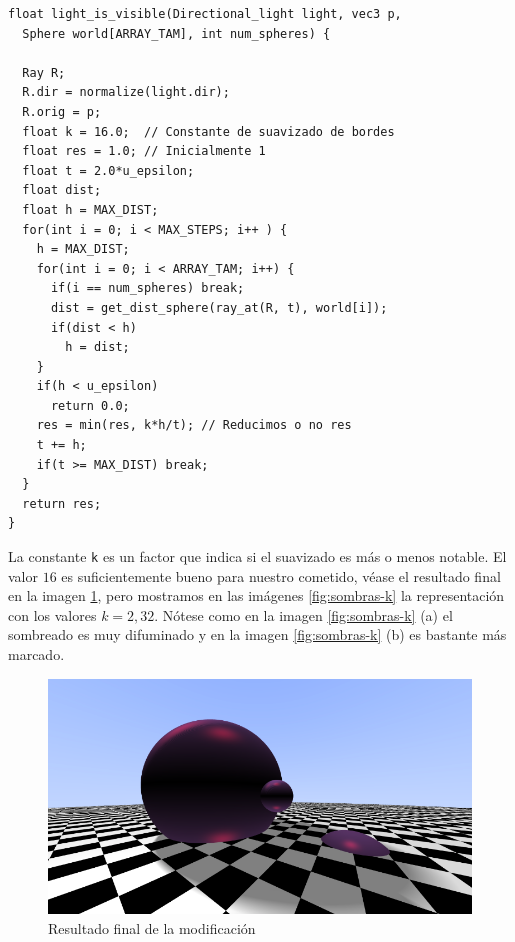 \begin{lstlisting}
float light_is_visible(Directional_light light, vec3 p, 
  Sphere world[ARRAY_TAM], int num_spheres) {
  
  Ray R;
  R.dir = normalize(light.dir);
  R.orig = p;
  float k = 16.0;  // Constante de suavizado de bordes
  float res = 1.0; // Inicialmente 1
  float t = 2.0*u_epsilon;
  float dist;
  float h = MAX_DIST;
  for(int i = 0; i < MAX_STEPS; i++ ) {
    h = MAX_DIST;
    for(int i = 0; i < ARRAY_TAM; i++) {
      if(i == num_spheres) break;
      dist = get_dist_sphere(ray_at(R, t), world[i]);
      if(dist < h)
        h = dist;
    }
    if(h < u_epsilon)
      return 0.0;
    res = min(res, k*h/t); // Reducimos o no res
    t += h;
    if(t >= MAX_DIST) break;
  }
  return res;
}
\end{lstlisting}

La constante \verb|k| es un factor que indica si el suavizado es más o menos notable. El valor $16$ es suficientemente bueno para nuestro cometido, véase el resultado final en la imagen \ref{fig:sombras-final}, pero mostramos en las imágenes \ref{fig:sombras-k} la representación con los valores $k=2,32$. Nótese como en la imagen \ref{fig:sombras-k} (a) el sombreado es muy difuminado y en la imagen \ref{fig:sombras-k} (b) es bastante más marcado.

\begin{figure} [ht]
    \centering
    \includegraphics[scale = 0.4]{img/C8/sombras-final.png}
    \caption{Resultado final de la modificación}
    \label{fig:sombras-final}
\end{figure}


